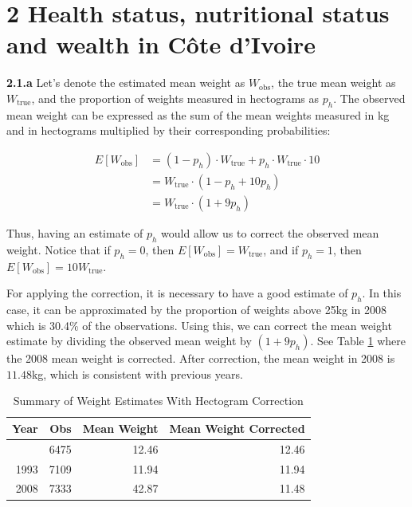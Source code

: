 \documentclass[
  letterpaper,
  DIV=11,
  numbers=noendperiod]{scrartcl}
\begin{document}
\section{2 Health status, nutritional status and wealth in Côte
d'Ivoire}\label{health-status-nutritional-status-and-wealth-in-cuxf4te-divoire}

\textbf{2.1.a} Let's denote the estimated mean weight as
\(W_{\text{obs}}\), the true mean weight as \(W_{\text{true}}\), and the
proportion of weights measured in hectograms as \(p_h\). The observed
mean weight can be expressed as the sum of the mean weights measured in
kg and in hectograms multiplied by their corresponding probabilities:

\[
\begin{aligned}
E[W_{\text{obs}}] &= (1 - p_h) \cdot W_{\text{true}} + p_h \cdot W_{\text{true}}\cdot 10\\
  &= W_{\text{true}} \cdot (1 - p_h + 10 p_h)\\
  &= W_{\text{true}} \cdot (1 + 9 p_h)
\end{aligned}
\]

Thus, having an estimate of \(p_h\) would allow us to correct the
observed mean weight. Notice that if \(p_h = 0\), then
\(E[W_{\text{obs}}] = W_{\text{true}}\), and if \(p_h = 1\), then
\(E[W_{\text{obs}}] = 10 W_{\text{true}}\).

For applying the correction, it is necessary to have a good estimate of
\(p_h\). In this case, it can be approximated by the proportion of
weights above 25kg in 2008 which is 30.4\% of the observations. Using
this, we can correct the mean weight estimate by dividing the observed
mean weight by \((1 + 9 p_h)\). See Table
\ref{tbl-corrected_weight_mean} where the 2008 mean weight is corrected.
After correction, the mean weight in 2008 is \(11.48\)kg, which is
consistent with previous years.

{

\begin{longtable}[]{@{}rrrr@{}}

\caption{\label{tbl-corrected_weight_mean}Summary of Weight Estimates
With Hectogram Correction}

\tabularnewline

\toprule\noalign{}
Year & Obs & Mean Weight & Mean Weight Corrected \\
\midrule\noalign{}
\endhead
\bottomrule\noalign{}
\endlastfoot
1988 & 6475 & 12.46 & 12.46 \\
1993 & 7109 & 11.94 & 11.94 \\
2008 & 7333 & 42.87 & 11.48 \\

\end{longtable}

}
\end{document}
